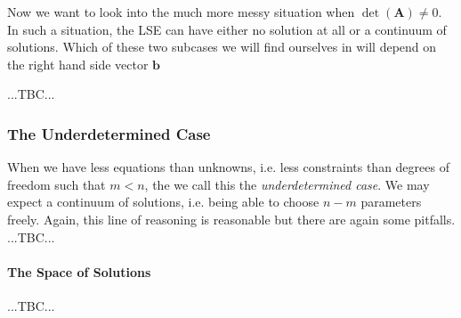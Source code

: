 \medskip
Now we want to look into the much more messy situation when $\det(\mathbf{A}) \neq 0$. 
In such a situation, the LSE can have either no solution at all or a continuum of solutions. Which of these two subcases we will find ourselves in will depend on the right hand side vector $\mathbf{b}$






...TBC...

\subsubsection{The Underdetermined Case}
When we have less equations than unknowns, i.e. less constraints than degrees of freedom such that $m < n$, the we call this the \emph{underdetermined case}. We may expect a continuum of solutions, i.e. being able to choose $n-m$ parameters freely. Again, this line of reasoning is reasonable but there are again some pitfalls. ...TBC...

\paragraph{The Space of Solutions} ...TBC...

